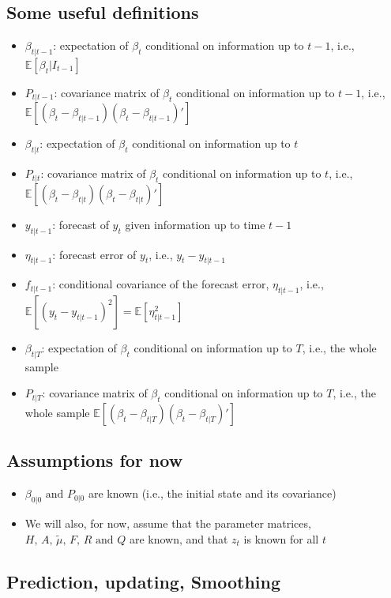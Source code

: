 \documentclass[10pt]{article}
\begin{document}
\subsection{Some useful definitions}
\begin{itemize}
    \item $\beta_{t|t - 1}$: expectation of $\beta_t $ conditional on information up to $t - 1 $, i.e., $\mathbb{E}[\beta_t|I_{t - 1}] $
    \item $P_{t | t - 1}$: covariance matrix of $\beta_t $ conditional on information up to $t  -1 $, i.e., $\mathbb{E}\left[(\beta_t - \beta_{t|t - 1})(\beta_t - \beta_{t|t - 1})'\right] $
    \item $\beta_{t|t} $: expectation of $\beta_t $ conditional on information up to $t $
    \item $P_{t|t} $: covariance matrix of $\beta_t $ conditional on information up to $t $, i.e., $\mathbb{E}\left[(\beta_t - \beta_{t|t})(\beta_t - \beta_{t|t })'\right] $
    \item $y_{t|t - 1} $: forecast of $y_t $ given information up to time $t - 1 $
    \item $\eta_{t|t - 1} $: forecast error of $y_t $, i.e., $y_t - y_{t|t - 1} $
    \item $f_{t|t - 1} $: conditional covariance of the forecast error, $\eta_{t|t - 1} $, i.e., $\mathbb{E}\left[(y_t - y_{t|t - 1})^2\right] = \mathbb{E}\left[\eta_{t|t - 1}^2\right]$
    \item $\beta_{t|T} $: expectation of $\beta_t $ conditional on information up to $T $, i.e., the whole sample 
    \item $P_{t|T} $: covariance matrix of $\beta_t $ conditional on information up to $T $, i.e., the whole sample $\mathbb{E}\left[(\beta_t -\beta_{t|T})(\beta_t - \beta_{t|T})'\right] $
\end{itemize}
\subsection{Assumptions for now}
\begin{itemize}
    \item $\beta_{0|0}\text{ and }P_{0|0} $ are known (i.e., the initial state and its covariance)
    \item We will also, for now, assume that the parameter matrices, $H,\, A,\, \tilde{\mu},\, F,\, R \text{ and } Q $ are known, and that $z_t $ is known for all $t $
\end{itemize}
\newpage 
\subsection{Prediction, updating, Smoothing}
\end{document}
